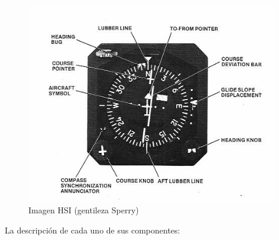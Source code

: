 \documentclass[a4paper,12pt,twoside]{article}
\begin{document}
\begin{figure}[!h]
  \centering
  \includegraphics[width=0.98\textwidth]{imagenes/hsi.png}  
  \caption{Imagen HSI (gentileza Sperry)}
  \label{fig:hsi.sperry}
\end{figure}


La descripci\'on de cada uno de sus componentes:
\end{document}
